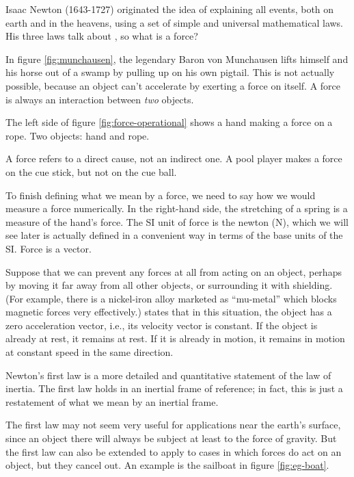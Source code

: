 Isaac Newton (1643-1727) originated the idea of explaining all events, both on earth and
in the heavens, using a set of simple and universal mathematical laws. His three laws
talk about , so what is a force?

In figure \ref{fig:munchausen}, the legendary Baron von Munchausen lifts himself and
his horse out of a swamp by pulling up on his own pigtail. 
This is not actually possible, because an object can't accelerate by exerting a force
on itself. A force is always an interaction between \emph{two} objects.


The left side of figure \ref{fig:force-operational} shows a hand making a force on a
rope. Two objects: hand and rope.

A force refers to a direct cause, not an indirect one. A pool player
makes a force on the cue stick, but not on the cue ball.\label{force-is-direct}

To finish defining what we mean by a force, we need to say how we would measure a
force numerically. In the right-hand side,
the stretching of a spring is a measure of the hand's force. The SI unit of force is
the newton (N), which we will see later is actually defined in a convenient way in terms
of the base units of the SI. Force is a vector.


Suppose that we can prevent any forces at all from acting on an object, perhaps by
moving it far away from all other objects, or surrounding it with shielding. (For example,
there is a nickel-iron alloy marketed as ``mu-metal'' which blocks magnetic forces very effectively.)
 states that in this situation,
the object has a zero acceleration vector, i.e., its velocity vector is constant.
If the object is already at rest, it remains at rest. If it is already in motion, it
remains in motion at constant speed in the same direction.

Newton's first law is a more detailed and quantitative statement of the law of inertia.
The first law holds in an inertial frame of reference; in fact, this is just a restatement
of what we mean by an inertial frame.


The first law may not seem very useful for applications near the earth's surface, since
an object there will always be subject at least to the force of gravity. But the first
law can also be extended to apply to cases in which forces do act on an object, but they
cancel out. An example is the sailboat in figure \ref{fig:eg-boat}.

